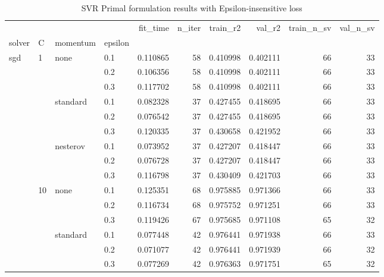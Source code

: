 \begin{table}[H]
\centering
\caption{SVR Primal formulation results with Epsilon-insensitive loss}
\label{primal_svr_eps_cv_results}
\begin{tabular}{llllrrrrrr}
\toprule
          &     &   &     &  fit\_time &  n\_iter &  train\_r2 &    val\_r2 &  train\_n\_sv &  val\_n\_sv \\
solver & C & momentum & epsilon &           &         &           &           &             &           \\
\midrule
sgd & 1   & none & 0.1 &  0.110865 &      58 &  0.410998 &  0.402111 &          66 &        33 \\
          &     &   & 0.2 &  0.106356 &      58 &  0.410998 &  0.402111 &          66 &        33 \\
          &     &   & 0.3 &  0.117702 &      58 &  0.410998 &  0.402111 &          66 &        33 \\
          &     & standard & 0.1 &  0.082328 &      37 &  0.427455 &  0.418695 &          66 &        33 \\
          &     &   & 0.2 &  0.076542 &      37 &  0.427455 &  0.418695 &          66 &        33 \\
          &     &   & 0.3 &  0.120335 &      37 &  0.430658 &  0.421952 &          66 &        33 \\
          &     & nesterov & 0.1 &  0.073952 &      37 &  0.427207 &  0.418447 &          66 &        33 \\
          &     &   & 0.2 &  0.076728 &      37 &  0.427207 &  0.418447 &          66 &        33 \\
          &     &   & 0.3 &  0.116798 &      37 &  0.430409 &  0.421703 &          66 &        33 \\
          & 10  & none & 0.1 &  0.125351 &      68 &  0.975885 &  0.971366 &          66 &        33 \\
          &     &   & 0.2 &  0.116734 &      68 &  0.975752 &  0.971251 &          66 &        33 \\
          &     &   & 0.3 &  0.119426 &      67 &  0.975685 &  0.971108 &          65 &        32 \\
          &     & standard & 0.1 &  0.077448 &      42 &  0.976441 &  0.971938 &          66 &        33 \\
          &     &   & 0.2 &  0.071077 &      42 &  0.976441 &  0.971939 &          66 &        32 \\
          &     &   & 0.3 &  0.077269 &      42 &  0.976363 &  0.971751 &          65 &        32 \\

\end{tabular}
\end{table}
